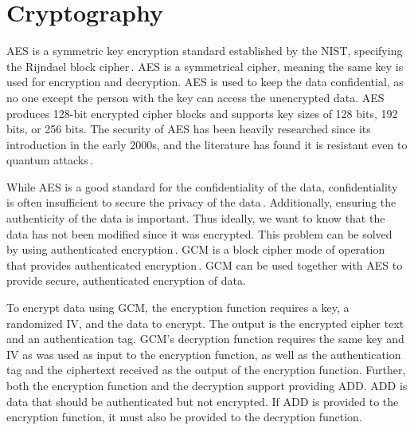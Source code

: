 \section{Cryptography}
\label{sec:back_crypto}
\gls{AES} is a symmetric key encryption standard established by the \gls{NIST}, specifying the Rijndael block cipher\,\cite{kumarvermaPerformanceAnalysisRC62012}. \gls{AES} is a symmetrical cipher, meaning the same key is used for encryption and decryption. \gls{AES} is used to keep the data confidential, as no one except the person with the key can access the unencrypted data. \gls{AES} produces \mbox{128-bit} encrypted cipher blocks and supports key sizes of 128 bits, 192 bits, or 256 bits. The security of \gls{AES} has been heavily researched since its introduction in the early 2000s, and the literature has found it is resistant even to quantum attacks\,\cite{bonnetainQuantumSecurityAnalysis2019}.

While \gls{AES} is a good standard for the confidentiality of the data, confidentiality is often insufficient to secure the privacy of the data\,\cite{rosswallrabensteinWhenItComes2021}. Additionally, ensuring the authenticity of the data is important. Thus ideally, we want to know that the data has not been modified since it was encrypted. This problem can be solved by using authenticated encryption\,\cite{khovratovichAnswerWhyShould2013}. \gls{GCM} is a block cipher mode of operation that provides authenticated encryption\,\cite{mcgrewGaloisCounterMode2004}. \gls{GCM} can be used together with \gls{AES} to provide secure, authenticated encryption of data.

To encrypt data using \gls{GCM}, the encryption function requires a key, a randomized \gls{IV}, and the data to encrypt. The output is the encrypted cipher text and an authentication tag. \gls{GCM}'s decryption function requires the same key and \gls{IV} as was used as input to the encryption function, as well as the authentication tag and the ciphertext received as the output of the encryption function. Further, both the encryption function and the decryption support providing \gls{ADD}. \gls{ADD} is data that should be authenticated but not encrypted. If \gls{ADD} is provided to the encryption function, it must also be provided to the decryption function.

